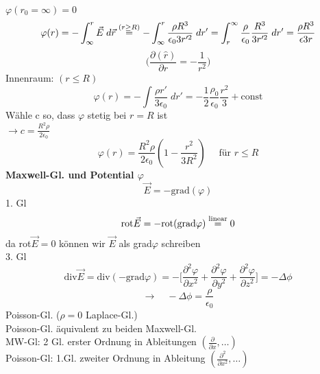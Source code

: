 \documentclass[titlepage,12pt,a4paper,ngerman]{report}
\newcommand{\tx}[1]{\textrm{#1}}
\begin{document}
$\varphi(r_0 = \infty) = 0$\\
$$\varphi(r) = -\int_\infty ^r \vec{E}\; d\vec{r} \buildrel (r\ge R) \over = -\int_\infty ^r \frac{\rho R^3}{\epsilon_0 3 r'^2}\; dr' =   \int_{r}^{\infty} \frac{\rho}{\epsilon_0} \frac{R^3}{3 r'^2}\; d r' = \frac{\rho R^3}{\epsilon 3 r}$$
$$\Big(\frac{\partial (\hat{r})}{\partial r} = - \frac{1}{r^2}\Big)$$
Innenraum: $(r\le R)$
$$\varphi (r) = -\int \frac{\rho r'}{3 \epsilon_0 } \; dr' = -\frac{1}{2} \frac{\rho_0}{\epsilon_0} \frac{r^2}{3} + \textrm{const}$$
Wähle c so, dass $\varphi$ stetig bei $r = R$ ist\\
$\rightarrow c = \frac{R^2 \rho}{2 \epsilon_0}$
$$\varphi(r) = \frac{R^2 \rho}{2 \epsilon_0} (1 - \frac{r^2}{3 R^2} ) \quad \textrm{ für } r\le R$$
\textbf{Maxwell-Gl. und Potential $\varphi$}
$$\vec{E} = -\textrm{grad}(\varphi)$$
1. Gl $$\textrm{rot}\vec{E} = - \textrm{rot}(\textrm{grad} \varphi )\buildrel \tx{linear} \over = 0$$
da rot$\vec{E} = 0$ können wir $\vec{E}$ als grad$\varphi$ schreiben\\
3. Gl $$\textrm{div}\vec{E} = \textrm{div}(-\textrm{grad} \varphi) = -\Big[\frac{\partial^2 \varphi}{\partial x^2} + \frac{\partial^2 \varphi}{\partial y^2} + \frac{\partial^2 \varphi}{\partial z^2} \Big] = - \Delta \phi$$
$$\rightarrow \quad -\Delta \phi = \frac{\rho}{\epsilon_0}$$ 
Poisson-Gl. ($\rho = 0$ Laplace-Gl.)\\
Poisson-Gl. äquivalent zu beiden Maxwell-Gl.\\
MW-Gl: 2 Gl. erster Ordnung in Ableitungen $(\frac{\partial}{\partial x} ,\dots )$\\
Poisson-Gl: 1.Gl. zweiter Ordnung in Ableitung $(\frac{\partial^2}{\partial x^2} , \dots )$\\
\end{document}
